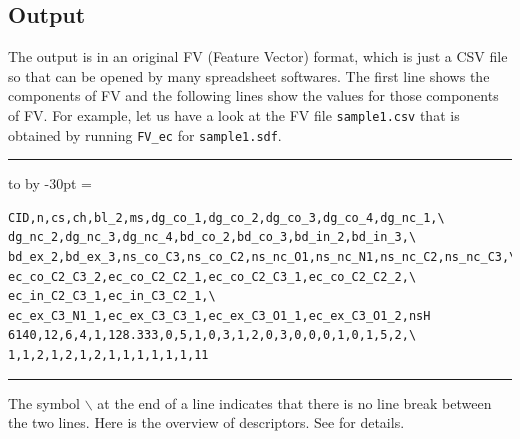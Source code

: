 \documentclass[11pt,titlepage,dvipdfmx,twoside]{book}
\newenvironment{myframe}{\begin{trivlist}\item[]
    \hrule
    \hbox to \linewidth\bgroup
    \advance\linewidth by -30pt
    \hsize=\linewidth
    \vrule\hfill
    \vbox\bgroup
    \vskip15pt
    \def\thempfootnote{\arabic{mpfootnote}}
    \begin{minipage}{\linewidth}}{%
    \end{minipage}\vskip15pt
    \egroup\hfill\vrule
    \egroup\hrule
\end{trivlist}}
\begin{document}
\subsection{Output}
The output is in an original FV (Feature Vector) format, which is just a CSV file so that can
be opened by many spreadsheet softwares.
The first line shows the components of FV and the following lines show the values
for those components of FV.
For example, let us have a look at the FV file {\tt sample1.csv} that is obtained by running {\tt FV\_ec} for
{\tt sample1.sdf}.

\begin{myframe}
\begin{verbatim}
CID,n,cs,ch,bl_2,ms,dg_co_1,dg_co_2,dg_co_3,dg_co_4,dg_nc_1,\
dg_nc_2,dg_nc_3,dg_nc_4,bd_co_2,bd_co_3,bd_in_2,bd_in_3,\
bd_ex_2,bd_ex_3,ns_co_C3,ns_co_C2,ns_nc_O1,ns_nc_N1,ns_nc_C2,ns_nc_C3,\
ec_co_C2_C3_2,ec_co_C2_C2_1,ec_co_C2_C3_1,ec_co_C2_C2_2,\
ec_in_C2_C3_1,ec_in_C3_C2_1,\
ec_ex_C3_N1_1,ec_ex_C3_C3_1,ec_ex_C3_O1_1,ec_ex_C3_O1_2,nsH
6140,12,6,4,1,128.333,0,5,1,0,3,1,2,0,3,0,0,0,1,0,1,5,2,\
1,1,2,1,2,1,2,1,1,1,1,1,1,11
\end{verbatim}
\end{myframe}

The symbol $\backslash$ at the end of a line
indicates that there is no line break between the two lines.
Here is the overview of descriptors. See \cite{AN20} for details. 
\end{document}
